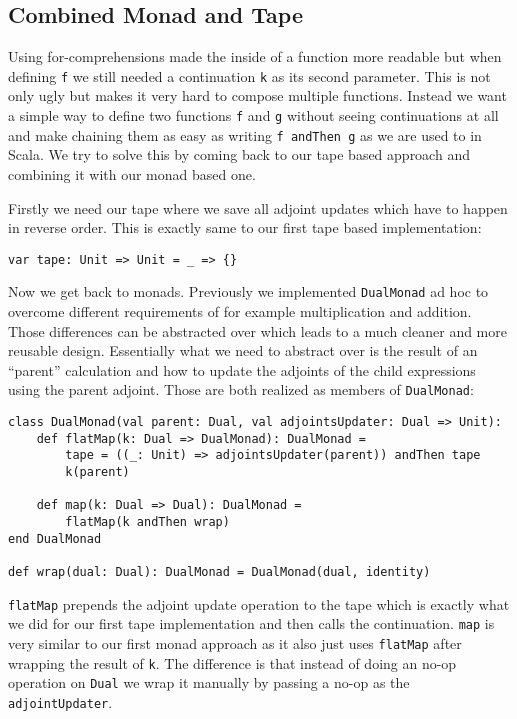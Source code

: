 \subsection{Combined Monad and Tape} \label{sec:monadAndTape}

Using for-comprehensions made the inside of a function more readable but when defining \lstinline{f} we still needed a continuation \lstinline{k} as its second parameter. This is not only ugly but makes it very hard to compose multiple functions. Instead we want a simple way to define two functions \lstinline{f} and \lstinline{g} without seeing continuations at all and make chaining them as easy as writing \lstinline{f andThen g} as we are used to in Scala. We try to solve this by coming back to our tape based approach and combining it with our monad based one. 

Firstly we need our tape where we save all adjoint updates which have to happen in reverse order. This is exactly same to our first tape based implementation:
\begin{lstlisting}
var tape: Unit => Unit = _ => {}
\end{lstlisting}

Now we get back to monads. Previously we implemented \lstinline{DualMonad} ad hoc to overcome different requirements of for example multiplication and addition. Those differences can be abstracted over which leads to a much cleaner and more reusable design. Essentially what we need to abstract over is the result of an ``parent'' calculation and how to update the adjoints of the child expressions using the parent adjoint. Those are both realized as members of \lstinline{DualMonad}:
\begin{lstlisting}
class DualMonad(val parent: Dual, val adjointsUpdater: Dual => Unit):
    def flatMap(k: Dual => DualMonad): DualMonad =
        tape = ((_: Unit) => adjointsUpdater(parent)) andThen tape
        k(parent)

    def map(k: Dual => Dual): DualMonad =
        flatMap(k andThen wrap)
end DualMonad

def wrap(dual: Dual): DualMonad = DualMonad(dual, identity)
\end{lstlisting}
\lstinline{flatMap} prepends the adjoint update operation to the tape which is exactly what we did for our first tape implementation and then calls the continuation. \lstinline{map} is very similar to our first monad approach as it also just uses \lstinline{flatMap} after wrapping the result of \lstinline{k}. The difference is that instead of doing an no-op operation on \lstinline{Dual} we wrap it manually by passing a no-op as the \lstinline{adjointUpdater}.

